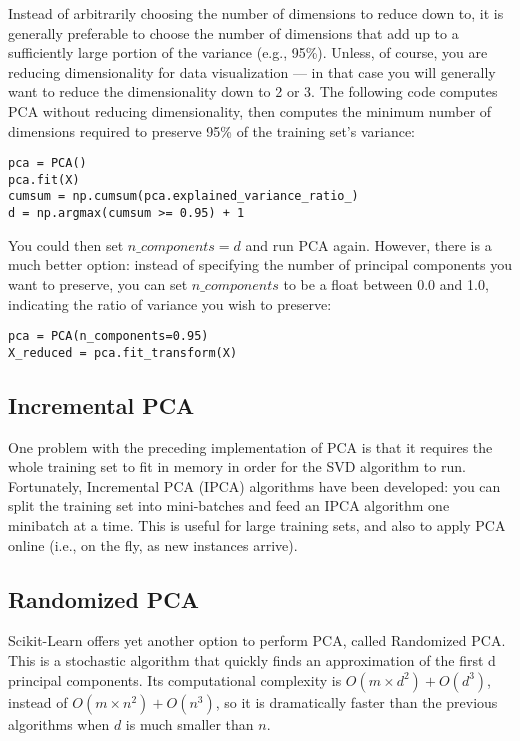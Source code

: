 \documentclass[%
oneside,                 %
final,                   %
10pt]{article}
\begin{document}
Instead of arbitrarily choosing the number of dimensions to reduce down to, it is generally preferable to
choose the number of dimensions that add up to a sufficiently large portion of the variance (e.g., 95\%).
Unless, of course, you are reducing dimensionality for data visualization — in that case you will
generally want to reduce the dimensionality down to 2 or 3.
The following code computes PCA without reducing dimensionality, then computes the minimum number
of dimensions required to preserve 95\% of the training set’s variance:
\begin{verbatim}
pca = PCA()
pca.fit(X)
cumsum = np.cumsum(pca.explained_variance_ratio_)
d = np.argmax(cumsum >= 0.95) + 1
\end{verbatim}
You could then set $n\_components=d$ and run PCA again. However, there is a much better option: instead
of specifying the number of principal components you want to preserve, you can set $n\_components$ to be
a float between 0.0 and 1.0, indicating the ratio of variance you wish to preserve:
\begin{verbatim}
pca = PCA(n_components=0.95)
X_reduced = pca.fit_transform(X)
\end{verbatim}

\subsection*{Incremental PCA}

One problem with the preceding implementation of PCA is that it requires the whole training set to fit in
memory in order for the SVD algorithm to run. Fortunately, Incremental PCA (IPCA) algorithms have
been developed: you can split the training set into mini-batches and feed an IPCA algorithm one minibatch
at a time. This is useful for large training sets, and also to apply PCA online (i.e., on the fly, as new
instances arrive).

\subsection*{Randomized PCA}

Scikit-Learn offers yet another option to perform PCA, called Randomized PCA. This is a stochastic
algorithm that quickly finds an approximation of the first d principal components. Its computational
complexity is $O(m \times d^2)+O(d^3)$, instead of $O(m \times n^2) + O(n^3)$, so it is dramatically faster than the
previous algorithms when $d$ is much smaller than $n$.
\end{document}
